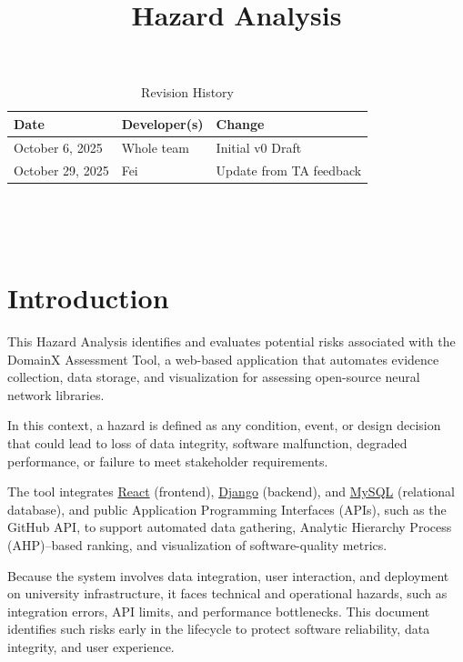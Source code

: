 \documentclass{article}
\title{Hazard Analysis\\\progname}
\author{\authname}
\date{}
\begin{document}
\maketitle
\thispagestyle{empty}

\begin{table}[hp]
\caption{Revision History} \label{TblRevisionHistory}
\begin{tabularx}{\textwidth}{llX}
\toprule
\textbf{Date} & \textbf{Developer(s)} & \textbf{Change}\\
\midrule
October 6, 2025  & Whole team & Initial v0 Draft\\
October 29, 2025 & Fei & Update from TA feedback\\
\bottomrule
\end{tabularx}
\end{table}

~\newpage
\thispagestyle{empty}

\tableofcontents

~\newpage


\section{Introduction}


This Hazard Analysis identifies and evaluates potential risks associated with
the DomainX Assessment Tool, a web-based application that
automates evidence collection, data storage, and visualization for assessing
open-source neural network libraries.

In this context, a hazard is defined as any condition, event, or design
decision that could lead to loss of data integrity, software malfunction,
degraded performance, or failure to meet stakeholder requirements.

The tool integrates \href{https://react.dev/}{React} (frontend), \href{https://www.djangoproject.com/}{Django} (backend), and \href{https://www.mysql.com/}{MySQL}
(relational database), and public Application Programming Interfaces (APIs), such as the
GitHub API, to support automated data gathering, Analytic Hierarchy Process
(AHP)--based ranking, and visualization of software-quality metrics.

Because the system involves data integration, user interaction, and deployment
on university infrastructure, it faces technical and operational hazards, such as integration errors, API limits, and performance bottlenecks. This
document identifies such risks early in the lifecycle to protect software
reliability, data integrity, and user experience.
\end{document}
